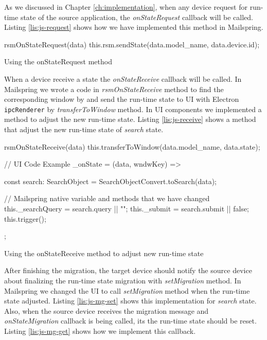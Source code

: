 As we discussed in Chapter \ref{ch:implementation}, when any device request for run-time state of the source application, the \textit{onStateRequest} callback will be called. Listing \ref{lis:js-request} shows how we have implemented this method in Mailspring. 
  
\FloatBarrier
\begin{code}
\begin{js2}
rsmOnStateRequest(data) {
   this.rsm.sendState(data.model_name, data.device.id);
}
\end{js2}
\caption{Using the onStateRequest method}
\label{lis:js-request}
\end{code}
\FloatBarrier

When a device receive a state the \textit{onStateReceive} callback will be called. In Mailspring we wrote a code in \textit{rsmOnStateReceive} method to find the corresponding window by and send the run-time state to UI with Electron \lstinline[basicstyle=\ttfamily]{ipcRenderer} by \textit{transferToWindow} method. In UI components we implemented a method to adjust the new run-time state. Listing \ref{lis:js-receive} shows a method that adjust the new run-time state of \textit{search} state.

\FloatBarrier
\begin{code}
\begin{js2}

rsmOnStateReceive(data) {
    this.transferToWindow(data.model_name, data.state);
}

// UI Code Example
_onState = (data, wndwKey) => {
    const search: SearchObject = SearchObjectConvert.toSearch(data);
    
    // Mailspring native variable and methods that we have changed
    this._searchQuery = search.query || "";
    this._submit = search.submit || false;
    this.trigger();
};
\end{js2}
\caption{Using the onStateReceive method to adjust new run-time state}
\label{lis:js-receive}
\end{code}
\FloatBarrier

After finishing the migration, the target device should notify the source device about finalizing the run-time state migration with \textit{setMigration} method. In Mailspring we changed the UI to call \textit{setMigration} method when the run-time state adjusted. Listing \ref{lis:js-mg-set} shows this implementation for \textit{search} state.
Also, when the source device receives the migration message and \textit{onStateMigration} callback is being called, its the run-time state should be reset. Listing \ref{lis:js-mg-get} shows how we implement this callback. 


